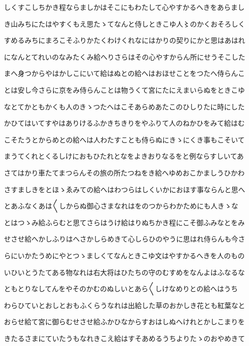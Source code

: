 \documentclass[a4paper,11pt,landscape]{ltjtarticle}
\begin{document}
しくすこしちかき程ならましかはそこにもわたして心やすかるへきをあらまし
\par\medskip
き山みちにたはやすくもえ思たゝてなんと侍しときこゆ人〻のかくおそろしく
\par\medskip
すめるみちにまろこそふりかたくわけくれなにはかりの契りにかと思はあはれ
\par\medskip
になんとてれいのなみたくみ給へりさらはその心やすからん所にせうそこした
\par\medskip
まへ身つからやはかしこにいて給はぬとの給へはおほせことをつたへ侍らんこ
\par\medskip
とは安し今さらに京をみ侍らんことは物うくて宮にたにえまいらぬをときこゆ
\par\medskip
なとてかともかくも人のきゝつたへはこそあらめあたこのひしりたに時にした
\par\medskip
かひてはいてすやはありけるふかきちきりをやふりて人のねかひをみて給はむ
\par\medskip
こそたうとからめとの給へは人わたすことも侍らぬにきゝにくき事もこそいて
\par\medskip
まうてくれとくるしけにおもひたれとなをよきおりなるをと例ならすしいてあ
\par\medskip
さてはかり車たてまつらんその旅の所たつねをき給へゆめおこかましうひかわ
\par\medskip
さすましきをとほゝゑみての給へはわつらはしくいかにおほす事ならんと思へ
\par\medskip
とあふなくあは〱しからぬ御心さまなれはをのつからわかためにも人きゝな
\par\medskip
とはつゝみ給ふらむと思てさらはうけ給はりぬちかき程にこそ御ふみなとをみ
\par\medskip
せさせ給へかしふりはへさかしらめきて心しらひのやうに思はれ侍らんも今さ
\par\medskip
らにいかたうめにやとつゝましくてなんときこゆ文はやすかるへきを人のもの
\par\medskip
いひいとうたてある物なれは右大将はひたちの守のむすめをなんよはふなるな
\par\medskip
ともとりなしてんをやそのかむのぬしいとあら〱しけなめりとの給へはうち
\par\medskip
わらひていとおしとおもふくらうなれは出給した草のおかしき花とも紅葉なと
\par\medskip
おらせ給て宮に御らむせさせ給ふかひなからすおはしぬへけれとかしこまりを
\par\medskip
きたるさまにていたうもなれきこえ給はすそあめるうちよりたゝのおやめきて
\par\medskip
\end{document}
